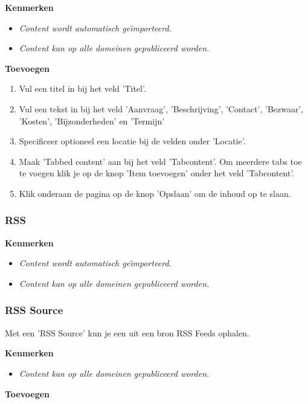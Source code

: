 \textbf{Kenmerken}

\begin{itemize}
\item \emph{Content wordt automatisch ge{\"\i}mporteerd.}
\item \emph{Content kan op alle domeinen gepubliceerd worden.}
\end{itemize}

\textbf{Toevoegen}

\begin{enumerate}
\item Vul een titel in bij het veld 'Titel'.
\item Vul een tekst in bij het veld 'Aanvraag', 'Beschrijving', 'Contact', 'Bezwaar', 'Kosten', 'Bijzonderheden' en 'Termijn'
\item Specificeer optioneel een locatie bij de velden onder 'Locatie'.
\item Maak 'Tabbed content' aan bij het veld 'Tabcontent'. Om meerdere tabs toe te voegen klik je op de knop 'Item toevoegen' onder het veld 'Tabcontent'.
\item Klik onderaan de pagina op de knop 'Opslaan' om de inhoud op te slaan.
\end{enumerate}

\subsubsection{RSS}\label{rss}

\textbf{Kenmerken}

\begin{itemize}
\item \emph{Content wordt automatisch ge{\"\i}mporteerd.}
\item \emph{Content kan op alle domeinen gepubliceerd worden.}
\end{itemize}

\subsubsection{RSS Source}\label{rsssource}
Met een 'RSS Source' kun je een uit een bron RSS Feeds ophalen.

\textbf{Kenmerken}

\begin{itemize}
\item \emph{Content kan op alle domeinen gepubliceerd worden.}
\end{itemize}

\textbf{Toevoegen}

